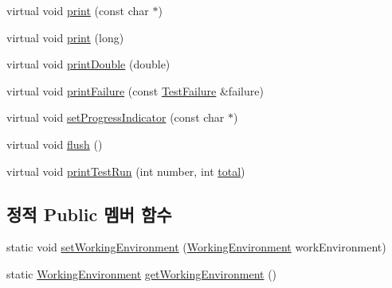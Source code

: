 \begin{DoxyCompactItemize}
\item 
virtual void \hyperlink{class_composite_test_output_a321b5c489a90374cb61c34fe5d2253ef}{print} (const char $\ast$)
\item 
virtual void \hyperlink{class_composite_test_output_afdf7e5004a8aead20ea3b1ddec76fa73}{print} (long)
\item 
virtual void \hyperlink{class_composite_test_output_a0ed13c187762336a2bf0fd89687b014a}{print\+Double} (double)
\item 
virtual void \hyperlink{class_composite_test_output_abda4b89457f485fa538443ee10aecfe8}{print\+Failure} (const \hyperlink{class_test_failure}{Test\+Failure} \&failure)
\item 
virtual void \hyperlink{class_composite_test_output_a97c09fc275d40b7ec559aaa91843cdcd}{set\+Progress\+Indicator} (const char $\ast$)
\item 
virtual void \hyperlink{class_composite_test_output_adac116554b543b7c4228c018a85882f5}{flush} ()
\item 
virtual void \hyperlink{class_test_output_a0cffc4628d21b0cd25649f9084927ca9}{print\+Test\+Run} (int number, int \hyperlink{test__intervals_8c_ac7af894858cf396a219d632f40afdc8d}{total})
\end{DoxyCompactItemize}
\subsection*{정적 Public 멤버 함수}
\begin{DoxyCompactItemize}
\item 
static void \hyperlink{class_test_output_a25907ddd60d8454ca78f81edef6c77c3}{set\+Working\+Environment} (\hyperlink{class_test_output_a0541851f863713454486a9fb3080f766}{Working\+Environment} work\+Environment)
\item 
static \hyperlink{class_test_output_a0541851f863713454486a9fb3080f766}{Working\+Environment} \hyperlink{class_test_output_a90d5028d0f7f6f41ca2dced042a8709d}{get\+Working\+Environment} ()
\end{DoxyCompactItemize}
